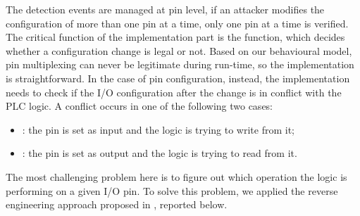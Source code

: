 The detection events are managed at pin level, \ie if an attacker modifies the configuration of more than one pin at a time, only one pin at a time is verified.
The critical function of the implementation part is the  function, which decides whether a configuration change is legal or not.
Based on our behavioural model, pin multiplexing can never be legitimate during run-time, so the implementation is straightforward.
In the case of pin configuration, instead, the implementation needs to check if the I/O configuration after the change is in conflict with the PLC logic.
A conflict occurs in one of the following two cases:
\begin{itemize}
	\item {}: the pin is set as input and the logic is trying to write from it;
	\item {}: the pin is set as output and the logic is trying to read from it.
\end{itemize}
The most challenging problem here is to figure out which operation the logic is performing on a given I/O pin.
To solve this problem, we applied the reverse engineering approach proposed in , reported below. 


